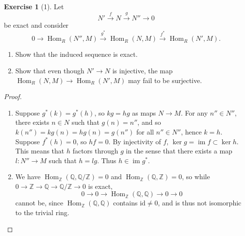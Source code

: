 \documentclass[reqno]{amsart}
\theoremstyle{definition}
\newtheorem{exercise}[theorem]{Exercise}
\theoremstyle{remark}
\DeclareMathOperator{\im}{im}
\DeclareMathOperator{\Hom}{Hom}
\newcommand{\id}{{\mathrm{id}}}
\begin{document}
    \begin{exercise}[1]
        Let
        \[
            N' \stackrel{f}{\to} N \stackrel{g}{\to} N'' \to 0
        \] 
        be exact and consider
        \[
            0 \to \Hom_R \left( N'', M \right) \stackrel{g^{*}}{\to}
            \Hom_R \left( N,M \right) \stackrel{f^{*}}{\to }
        \Hom_R \left( N', M \right) .
        \] 

        \begin{enumerate}
            \item Show that the induced sequence
                is exact.
            \item Show that even though
                $N' \to N$ is injective, the map
                $\Hom_R \left( N,M \right) \to 
                \Hom_R \left( N', M \right) $ may fail to
                be surjective.
        \end{enumerate}
    \end{exercise}

    \begin{proof}
        \begin{enumerate}
            \item Suppose
                $g^{*} \left( k \right) =
                g^{*} (h)$, so
                $kg = hg$ as maps
                $N \to M$. For any $n'' \in N''$, there
                exists $n \in N$ such that $g(n) = n''$, and
                so $k(n'') = kg(n) = hg(n) = g(n'')$ for all
                $n'' \in N''$, hence $k = h$. Suppose
                $f^{*}(h) = 0$, so $hf = 0$. By injectivity of
                $f$,  $\ker g = \im f \subset \ker h$.
                This means that $h$ factors through
                $g$ in the sense that there
                exists a map $l \colon N'' \to M$ such that
                $h = lg$. Thus
                $h \in \im g^{*}$.
            \item We have $\Hom_{\mathbb{Z}}
                \left( \mathbb{Q}, \mathbb{Q} / \mathbb{Z} \right) 
                = 0$ and
                $\Hom_{\mathbb{Z}}\left( \mathbb{Q},
                \mathbb{Z}\right) = 0$, so
                while
                $0 \to \mathbb{Z}\to \mathbb{Q} \to 
                \mathbb{Q} / \mathbb{Z} \to 0$ is exact,
                \[
                0 \to 0 \to \Hom_{\mathbb{Z}}\left( \mathbb{Q},
                \mathbb{Q}\right) \to 
                0 \to 0
                \] 
                cannot be, since
                $\Hom_{\mathbb{Z}}\left( \mathbb{Q},
                \mathbb{Q}\right) $ contains
                $\id \neq 0$, and is thus not isomorphic
                to the trivial ring.
        \end{enumerate}
    \end{proof}
\end{document}
